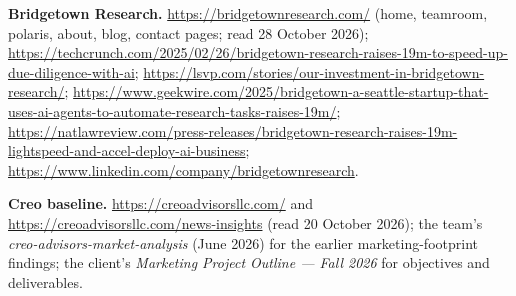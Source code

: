 \documentclass[11pt]{article}
\begin{document}
\medskip
\textbf{Bridgetown Research.}
\url{https://bridgetownresearch.com/} (home, teamroom, polaris, about, blog, contact
pages; read 28 October 2026);
\url{https://techcrunch.com/2025/02/26/bridgetown-research-raises-19m-to-speed-up-due-diligence-with-ai};
\url{https://lsvp.com/stories/our-investment-in-bridgetown-research/};
\url{https://www.geekwire.com/2025/bridgetown-a-seattle-startup-that-uses-ai-agents-to-automate-research-tasks-raises-19m/};
\url{https://natlawreview.com/press-releases/bridgetown-research-raises-19m-lightspeed-and-accel-deploy-ai-business};
\url{https://www.linkedin.com/company/bridgetownresearch}.

\medskip
\textbf{Creo baseline.}
\url{https://creoadvisorsllc.com/} and \url{https://creoadvisorsllc.com/news-insights}
(read 20 October 2026); the team's \emph{creo-advisors-market-analysis} (June 2026) for
the earlier marketing-footprint findings; the client's \emph{Marketing Project Outline
--- Fall 2026} for objectives and deliverables.
\end{document}
